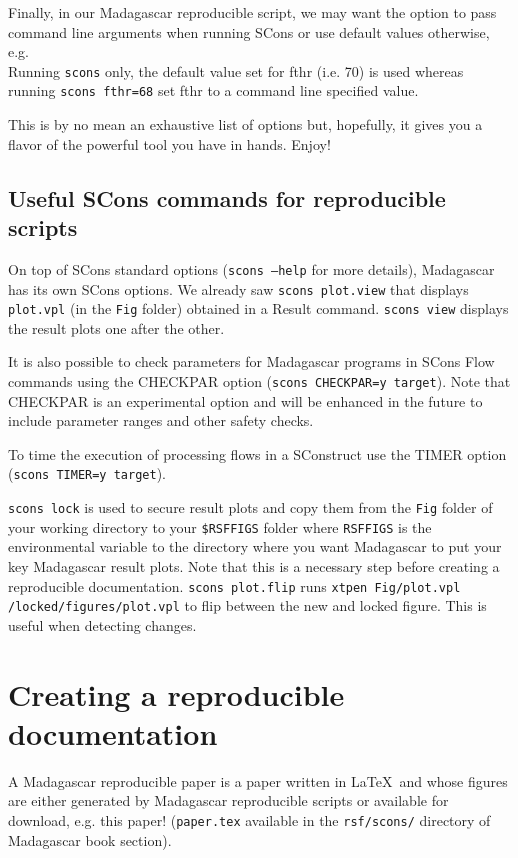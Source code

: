 Finally, in our Madagascar reproducible script, we may want the option
to pass command line arguments when running SCons or use default
values otherwise, e.g.\\



Running \texttt{scons} only, the default value set for fthr (i.e. 70)
is used whereas running \texttt{scons fthr=68} set fthr to a command
line specified value.

This is by no mean an exhaustive list of options but, hopefully, it
gives you a flavor of the powerful tool you have in hands. Enjoy!

\subsection{Useful SCons commands for reproducible scripts}

On top of SCons standard options (\texttt{scons --help} for more
details), Madagascar has its own SCons options. We already saw
\texttt{scons plot.view} that displays \texttt{plot.vpl} (in the
\texttt{Fig} folder) obtained in a Result command. \texttt{scons view}
displays the result plots one after the other.

It is also possible to check parameters for Madagascar programs in
SCons Flow commands using the CHECKPAR option (\texttt{scons
  CHECKPAR=y target}). Note that CHECKPAR is an experimental option
and will be enhanced in the future to include parameter ranges and
other safety checks.

To time the execution of processing flows in a SConstruct use the
TIMER option (\texttt{scons TIMER=y target}).

\texttt{scons lock} is used to secure result plots and copy them from
the \texttt{Fig} folder of your working directory to your
\texttt{\$RSFFIGS} folder where \texttt{RSFFIGS} is the environmental
variable to the directory where you want Madagascar to put your key
Madagascar result plots. Note that this is a necessary step before
creating a reproducible documentation. \texttt{scons plot.flip} runs
\texttt{xtpen Fig/plot.vpl /locked/figures/plot.vpl} to flip between
the new and locked figure. This is useful when detecting changes.

\section{Creating a reproducible documentation}
%
A Madagascar reproducible paper is a paper written in \LaTeX\ and
whose figures are either generated by Madagascar reproducible scripts
or available for download, e.g.  this paper!  (\texttt{paper.tex}
available in the \texttt{rsf/scons/} directory of Madagascar book
section).

